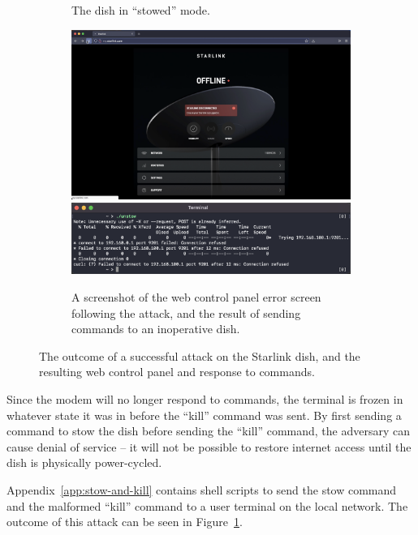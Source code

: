 \begin{figure}
\begin{subfigure}{.23235\textwidth}
        \caption{The dish in ``stowed'' mode.\vspace{1em}}
    \end{subfigure}
    \begin{subfigure}{.55\textwidth}
        \centering\includegraphics[width=\textwidth]{img/offline.png}\\\vspace{.35em}
        \centering\includegraphics[width=\textwidth]{img/unstow.png}
        \caption{A screenshot of the web control panel error screen following the attack, and the result of sending commands to an inoperative dish.}
    \end{subfigure}
\caption{The outcome of a successful attack on the Starlink dish, and the resulting web control panel and response to commands.}
\label{fig:attack-outcome}
\end{figure}

Since the modem will no longer respond to commands, the terminal is frozen in whatever state it was in before the ``kill'' command was sent.
By first sending a command to stow the dish before sending the ``kill'' command, the adversary can cause denial of service -- it will not be possible to restore internet access until the dish is physically power-cycled.

Appendix~\ref{app:stow-and-kill} contains shell scripts to send the stow command and the malformed ``kill'' command to a user terminal on the local network.
The outcome of this attack can be seen in Figure~\ref{fig:attack-outcome}.

